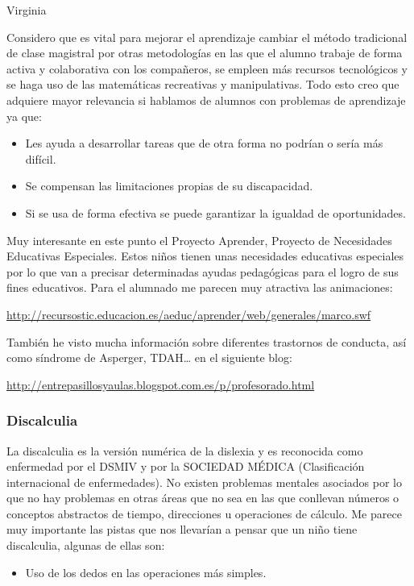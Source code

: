 \begin{opin}{\virgicolor}{Virginia}

Considero que es vital para mejorar el aprendizaje cambiar el método tradicional de clase magistral por otras metodologías en las que el alumno trabaje de forma activa y colaborativa con los compañeros, se empleen más recursos tecnológicos y se haga uso de las matemáticas recreativas y manipulativas. Todo esto creo que adquiere mayor relevancia si hablamos de alumnos con problemas de aprendizaje ya que:

\begin{itemize}
\item Les ayuda a desarrollar tareas que de otra forma no podrían o sería más difícil.
\item Se compensan las limitaciones propias de su discapacidad.
\item Si se usa de forma efectiva se puede garantizar la igualdad de oportunidades.
\end{itemize}

Muy interesante en este punto el Proyecto Aprender, Proyecto de Necesidades Educativas Especiales. Estos niños tienen unas necesidades educativas especiales por lo que van a precisar determinadas ayudas pedagógicas para el logro de sus fines educativos.  Para el alumnado me parecen muy atractiva las animaciones: 

\url{http://recursostic.educacion.es/aeduc/aprender/web/generales/marco.swf}

También he visto mucha información sobre diferentes trastornos de conducta, así como síndrome de Asperger, TDAH… en el siguiente blog:

\url{http://entrepasillosyaulas.blogspot.com.es/p/profesorado.html}

\subsubsection{Discalculia}

La discalculia es la versión numérica de la dislexia y es reconocida como enfermedad por el DSMIV y por la SOCIEDAD MÉDICA (Clasificación internacional de enfermedades). No existen problemas mentales asociados por lo que no hay problemas en otras áreas que no sea en las que conllevan números o conceptos abstractos de tiempo, direcciones u operaciones de cálculo. Me parece muy importante las pistas que nos llevarían a pensar que un niño tiene discalculia, algunas de ellas son:

\begin{itemize}
\item Uso de los dedos en las operaciones más simples.


\end{itemize}
\end{opin}
